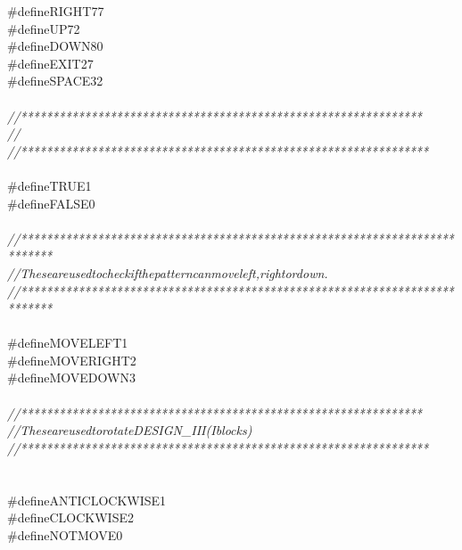 \documentclass[a4paper, 10pt]{article}
\newcommand\SPC{\hspace*{0.6em}}
\newcommand\HYP{\mbox{\char 45}}
\newcommand{\CppAComment}[1]{\textit{\textcolor[rgb]{0.2,0.6,1}{#1}}}
\newcommand{\CppAPreprocessor}[1]{\textcolor[rgb]{0,0.5,0}{#1}}
\begin{document}
\begin{ttfamily}
\CppAPreprocessor{\#define\SPC RIGHT\SPC 77}\\
\CppAPreprocessor{\#define\SPC UP\SPC 72}\\
\CppAPreprocessor{\#define\SPC DOWN\SPC 80}\\
\CppAPreprocessor{\#define\SPC EXIT\SPC 27}\\
\CppAPreprocessor{\#define\SPC SPACE\SPC 32}\\
\\
\CppAComment{//***************************************************************}\\
\CppAComment{//}\\
\CppAComment{//****************************************************************}\\
\\
\CppAPreprocessor{\#define\SPC TRUE\SPC 1}\\
\CppAPreprocessor{\#define\SPC FALSE\SPC 0}\\
\\
\CppAComment{//***************************************************************************}\\
\CppAComment{//\SPC \SPC \SPC \SPC These\SPC are\SPC used\SPC to\SPC check\SPC if\SPC the\SPC pattern\SPC can\SPC move\SPC \HYP \SPC left,\SPC right\SPC or\SPC down.}\\
\CppAComment{//***************************************************************************}\\
\\
\CppAPreprocessor{\#define\SPC MOVELEFT\SPC 1}\\
\CppAPreprocessor{\#define\SPC MOVERIGHT\SPC 2}\\
\CppAPreprocessor{\#define\SPC MOVEDOWN\SPC 3}\\
\\
\CppAComment{//***************************************************************}\\
\CppAComment{//\SPC \SPC \SPC \SPC \SPC \SPC \SPC \SPC \SPC \SPC These\SPC are\SPC used\SPC to\SPC rotate\SPC DESIGN\_III\SPC (\SPC I\SPC blocks\SPC )}\\
\CppAComment{//****************************************************************}\\
\\
\\
\CppAPreprocessor{\#define\SPC ANTICLOCKWISE\SPC 1}\\
\CppAPreprocessor{\#define\SPC CLOCKWISE\SPC 2}\\
\CppAPreprocessor{\#define\SPC NOTMOVE\SPC 0}\\

\end{ttfamily}
\end{document}

